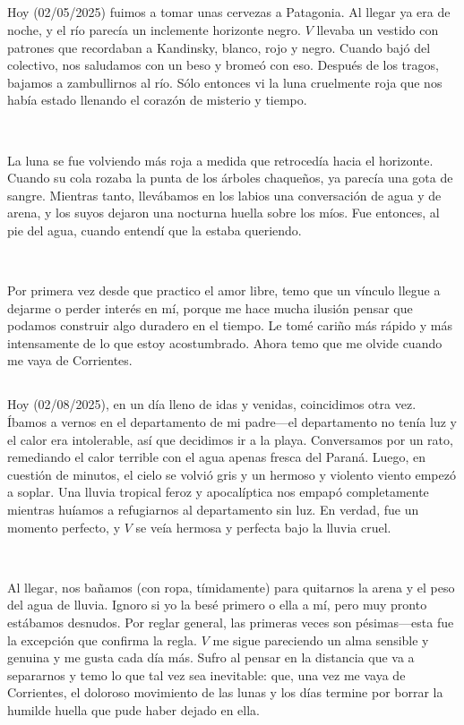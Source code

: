\documentclass[a4paper, 12pt]{article}
\begin{document}
\subsection{}

Hoy (02/05/2025) fuimos a tomar unas cervezas a Patagonia. Al llegar ya era de
noche, y el río parecía un inclemente horizonte negro. $V$ llevaba un vestido con
patrones que recordaban a Kandinsky, blanco, rojo y negro. Cuando bajó del 
colectivo, nos saludamos con un beso y bromeó con eso. Después de los tragos,
bajamos a zambullirnos al río. Sólo entonces vi la luna cruelmente roja que nos
había estado llenando el corazón de misterio y tiempo.

~

La luna se fue volviendo más roja a medida que retrocedía hacia el horizonte.
Cuando su cola rozaba la punta de los árboles chaqueños, ya parecía una gota de
sangre. Mientras tanto, llevábamos en los labios una conversación de agua y de
arena, y los suyos dejaron una nocturna huella sobre los míos. Fue entonces,
al pie del agua, cuando entendí que la estaba queriendo.

~ 

Por primera vez desde que practico el amor libre, temo que un vínculo llegue a
dejarme o perder interés en mí, porque me hace mucha ilusión pensar que podamos
construir algo duradero en el tiempo. Le tomé cariño más rápido y más
intensamente de lo que estoy acostumbrado. Ahora temo que me
olvide cuando me vaya de Corrientes.

\subsection{}

Hoy (02/08/2025), en un día lleno de idas y venidas, coincidimos otra vez.
Íbamos a vernos en el departamento de mi padre---el departamento no tenía luz y
el calor era intolerable, así que decidimos ir a la playa. Conversamos por un
rato, remediando el calor terrible con el agua apenas fresca del Paraná. Luego,
en cuestión de minutos, el cielo se volvió gris y un hermoso y violento viento
empezó a soplar. Una lluvia tropical feroz y apocalíptica nos empapó
completamente mientras huíamos a refugiarnos al departamento sin luz. En
verdad, fue un momento perfecto, y $V$ se veía hermosa y perfecta bajo la
lluvia cruel. 

~ 

Al llegar, nos bañamos (con ropa, tímidamente) para quitarnos la arena y el
peso del agua de lluvia. Ignoro si yo la besé primero o ella a mí, pero muy
pronto estábamos desnudos. Por reglar general, las primeras veces son
pésimas---esta fue la excepción que confirma la regla. $V$ me sigue pareciendo
un alma sensible y genuina y me gusta cada día más. Sufro al pensar en la
distancia que va a separarnos y temo lo que tal vez sea inevitable: que, una
vez me vaya de Corrientes, el doloroso movimiento de las lunas y los días
termine por borrar la humilde huella que pude haber dejado en ella.
\end{document}
